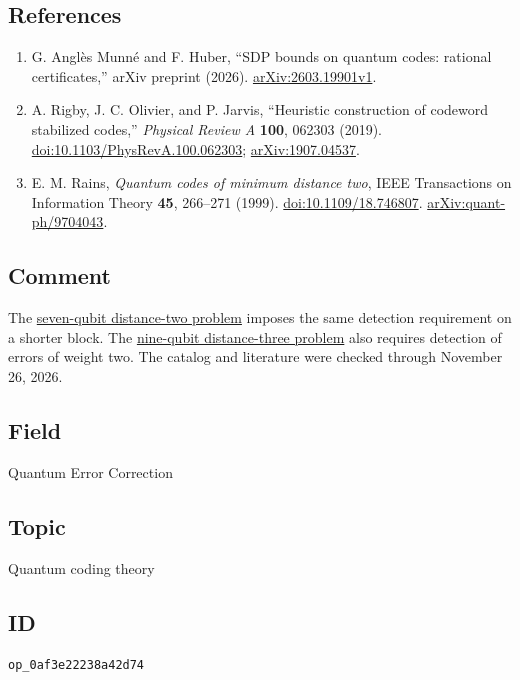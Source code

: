 \subsection*{References}

\begin{enumerate}[label={},leftmargin=4.8em,labelsep=0.5em]
  \footnotesize
  \item[\textup{[AMH26]}]\label{ref:d6-04-amh26}
  G. Anglès Munné and F. Huber, ``SDP bounds on quantum codes: rational certificates,'' arXiv preprint (2026). \href{https://arxiv.org/abs/2603.19901v1}{arXiv:2603.19901v1}.

  \item[\textup{[ROJ19]}]\label{ref:d6-04-roj19}
  A. Rigby, J. C. Olivier, and P. Jarvis, ``Heuristic construction of codeword stabilized codes,'' \emph{Physical Review A} \textbf{100}, 062303 (2019). \href{https://doi.org/10.1103/PhysRevA.100.062303}{doi:10.1103/PhysRevA.100.062303}; \href{https://arxiv.org/abs/1907.04537}{arXiv:1907.04537}.

  \item[\textup{[Rai99]}]\label{ref:d6-04-rains99}
  E. M. Rains, \emph{Quantum codes of minimum distance two}, IEEE Transactions on Information Theory \textbf{45}, 266--271 (1999). \href{https://doi.org/10.1109/18.746807}{doi:10.1109/18.746807}. \href{https://arxiv.org/abs/quant-ph/9704043}{arXiv:quant-ph/9704043}.
\end{enumerate}

\subsection*{Comment}

The \href{https://qiqc-op.com/problem/op_5ea7cb9abb281829/}{seven-qubit distance-two problem} imposes the same detection requirement on a shorter block. The \href{https://qiqc-op.com/problem/op_0d6ac674da115857/}{nine-qubit distance-three problem} also requires detection of errors of weight two. The catalog and literature were checked through November 26, 2026.

\subsection*{Field}

Quantum Error Correction

\subsection*{Topic}

Quantum coding theory

\subsection*{ID}

\texttt{op\_0af3e22238a42d74}

